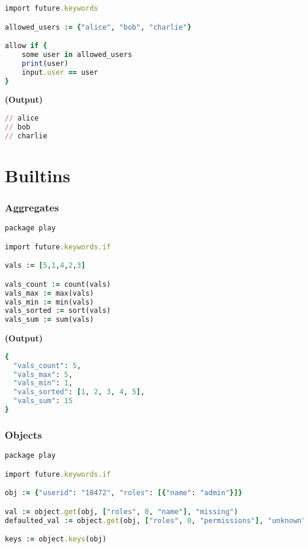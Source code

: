 \documentclass[twocolumn]{article}
\begin{document}
\begin{lstlisting}[language=Ruby]
import future.keywords

allowed_users := {"alice", "bob", "charlie"}

allow if {
	some user in allowed_users
	print(user)
	input.user == user
}
\end{lstlisting}



\textbf{\tiny{(Output)}}
\begin{lstlisting}[language=Ruby]
// alice
// bob
// charlie

\end{lstlisting}




\section*{Builtins}




\vspace{-1em}
\subsubsection*{Aggregates}

\begin{lstlisting}[language=Ruby]
package play

import future.keywords.if

vals := [5,1,4,2,3]

vals_count := count(vals)
vals_max := max(vals)
vals_min := min(vals)
vals_sorted := sort(vals)
vals_sum := sum(vals)
\end{lstlisting}



\textbf{\tiny{(Output)}}
\begin{lstlisting}[language=Ruby]
{
  "vals_count": 5,
  "vals_max": 5,
  "vals_min": 1,
  "vals_sorted": [1, 2, 3, 4, 5],
  "vals_sum": 15
}
\end{lstlisting}



\vspace{-1em}
\subsubsection*{Objects}

\begin{lstlisting}[language=Ruby]
package play

import future.keywords.if

obj := {"userid": "18472", "roles": [{"name": "admin"}]}

val := object.get(obj, ["roles", 0, "name"], "missing")
defaulted_val := object.get(obj, ["roles", 0, "permissions"], "unknown")

keys := object.keys(obj)
\end{lstlisting}
\end{document}
